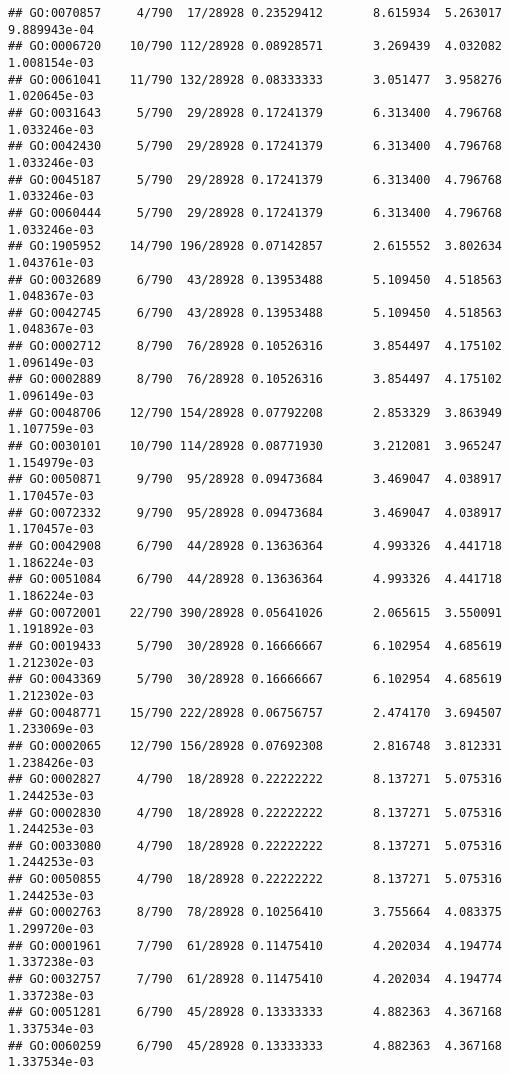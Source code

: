 \documentclass[
]{article}
\begin{document}
\begin{verbatim}
## GO:0070857     4/790  17/28928 0.23529412       8.615934  5.263017 9.889943e-04
## GO:0006720    10/790 112/28928 0.08928571       3.269439  4.032082 1.008154e-03
## GO:0061041    11/790 132/28928 0.08333333       3.051477  3.958276 1.020645e-03
## GO:0031643     5/790  29/28928 0.17241379       6.313400  4.796768 1.033246e-03
## GO:0042430     5/790  29/28928 0.17241379       6.313400  4.796768 1.033246e-03
## GO:0045187     5/790  29/28928 0.17241379       6.313400  4.796768 1.033246e-03
## GO:0060444     5/790  29/28928 0.17241379       6.313400  4.796768 1.033246e-03
## GO:1905952    14/790 196/28928 0.07142857       2.615552  3.802634 1.043761e-03
## GO:0032689     6/790  43/28928 0.13953488       5.109450  4.518563 1.048367e-03
## GO:0042745     6/790  43/28928 0.13953488       5.109450  4.518563 1.048367e-03
## GO:0002712     8/790  76/28928 0.10526316       3.854497  4.175102 1.096149e-03
## GO:0002889     8/790  76/28928 0.10526316       3.854497  4.175102 1.096149e-03
## GO:0048706    12/790 154/28928 0.07792208       2.853329  3.863949 1.107759e-03
## GO:0030101    10/790 114/28928 0.08771930       3.212081  3.965247 1.154979e-03
## GO:0050871     9/790  95/28928 0.09473684       3.469047  4.038917 1.170457e-03
## GO:0072332     9/790  95/28928 0.09473684       3.469047  4.038917 1.170457e-03
## GO:0042908     6/790  44/28928 0.13636364       4.993326  4.441718 1.186224e-03
## GO:0051084     6/790  44/28928 0.13636364       4.993326  4.441718 1.186224e-03
## GO:0072001    22/790 390/28928 0.05641026       2.065615  3.550091 1.191892e-03
## GO:0019433     5/790  30/28928 0.16666667       6.102954  4.685619 1.212302e-03
## GO:0043369     5/790  30/28928 0.16666667       6.102954  4.685619 1.212302e-03
## GO:0048771    15/790 222/28928 0.06756757       2.474170  3.694507 1.233069e-03
## GO:0002065    12/790 156/28928 0.07692308       2.816748  3.812331 1.238426e-03
## GO:0002827     4/790  18/28928 0.22222222       8.137271  5.075316 1.244253e-03
## GO:0002830     4/790  18/28928 0.22222222       8.137271  5.075316 1.244253e-03
## GO:0033080     4/790  18/28928 0.22222222       8.137271  5.075316 1.244253e-03
## GO:0050855     4/790  18/28928 0.22222222       8.137271  5.075316 1.244253e-03
## GO:0002763     8/790  78/28928 0.10256410       3.755664  4.083375 1.299720e-03
## GO:0001961     7/790  61/28928 0.11475410       4.202034  4.194774 1.337238e-03
## GO:0032757     7/790  61/28928 0.11475410       4.202034  4.194774 1.337238e-03
## GO:0051281     6/790  45/28928 0.13333333       4.882363  4.367168 1.337534e-03
## GO:0060259     6/790  45/28928 0.13333333       4.882363  4.367168 1.337534e-03

\end{verbatim}
\end{document}
